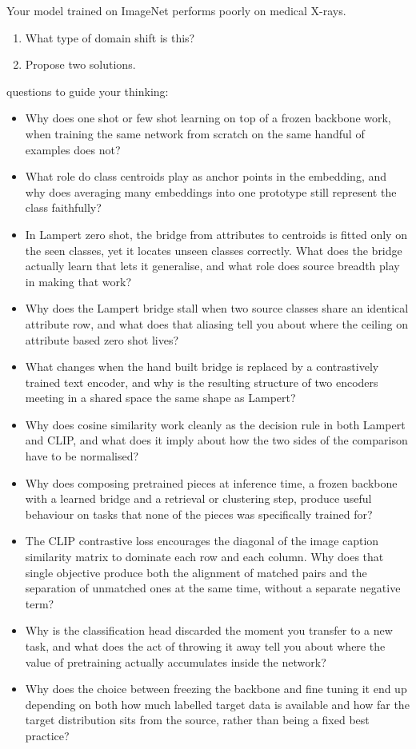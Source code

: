 Your model trained on ImageNet performs poorly on medical X-rays.

\begin{enumerate}
    \item What type of domain shift is this?
    \item Propose two solutions.
\end{enumerate}

\fi

 questions to guide your thinking:

\begin{itemize}
    \item Why does one shot or few shot learning on top of a frozen backbone work, when training the same network from scratch on the same handful of examples does not?
    \item What role do class centroids play as anchor points in the embedding, and why does averaging many embeddings into one prototype still represent the class faithfully?
    \item In Lampert zero shot, the bridge from attributes to centroids is fitted only on the seen classes, yet it locates unseen classes correctly. What does the bridge actually learn that lets it generalise, and what role does source breadth play in making that work?
    \item Why does the Lampert bridge stall when two source classes share an identical attribute row, and what does that aliasing tell you about where the ceiling on attribute based zero shot lives?
    \item What changes when the hand built bridge is replaced by a contrastively trained text encoder, and why is the resulting structure of two encoders meeting in a shared space the same shape as Lampert?
    \item Why does cosine similarity work cleanly as the decision rule in both Lampert and CLIP, and what does it imply about how the two sides of the comparison have to be normalised?
    \item Why does composing pretrained pieces at inference time, a frozen backbone with a learned bridge and a retrieval or clustering step, produce useful behaviour on tasks that none of the pieces was specifically trained for?
    \item The CLIP contrastive loss encourages the diagonal of the image caption similarity matrix to dominate each row and each column. Why does that single objective produce both the alignment of matched pairs and the separation of unmatched ones at the same time, without a separate negative term?
    \item Why is the classification head discarded the moment you transfer to a new task, and what does the act of throwing it away tell you about where the value of pretraining actually accumulates inside the network?
    \item Why does the choice between freezing the backbone and fine tuning it end up depending on both how much labelled target data is available and how far the target distribution sits from the source, rather than being a fixed best practice?
\end{itemize}

